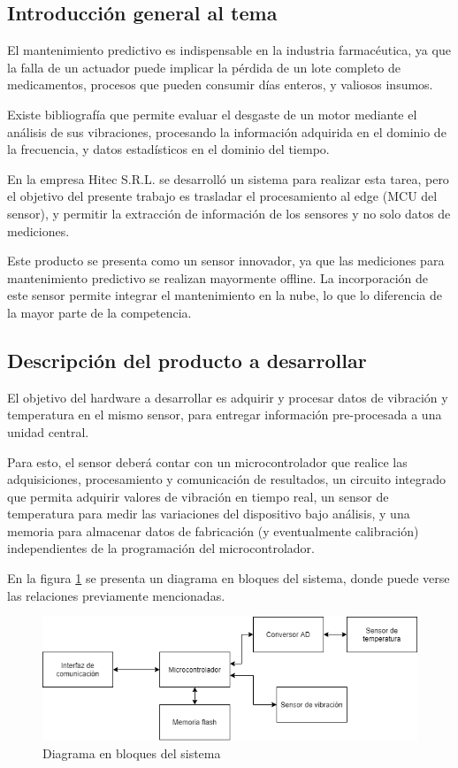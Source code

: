 \documentclass[11pt]{charter}
\begin{document}
\subsection*{Introducción general al tema}

El mantenimiento predictivo es indispensable en la industria farmacéutica, ya que la falla de un actuador puede implicar la pérdida de un lote completo de medicamentos, procesos que pueden consumir días enteros, y valiosos insumos.

Existe bibliografía que permite evaluar el desgaste de un motor mediante el análisis de sus vibraciones, procesando la información adquirida en el dominio de la frecuencia, y datos estadísticos en el dominio del tiempo.

En la empresa Hitec S.R.L. se desarrolló un sistema para realizar esta tarea, pero el objetivo del presente trabajo es trasladar el procesamiento al edge (MCU del sensor), y permitir la extracción de información de los sensores y no solo datos de mediciones.

Este producto se presenta como un sensor innovador, ya que las mediciones para mantenimiento predictivo se realizan mayormente offline. La incorporación de este sensor permite integrar el mantenimiento en la nube, lo que lo diferencia de la mayor parte de la competencia.

\subsection*{Descripción del producto a desarrollar}

El objetivo del hardware a desarrollar es adquirir y procesar datos de vibración y temperatura en el mismo sensor, para entregar información pre-procesada a una unidad central.

Para esto, el sensor deberá contar con un microcontrolador que realice las adquisiciones, procesamiento y comunicación de resultados, un circuito integrado que permita adquirir valores de vibración en tiempo real, un sensor de temperatura para medir las variaciones del dispositivo bajo análisis, y una memoria para almacenar datos de fabricación (y eventualmente calibración) independientes de la programación del microcontrolador. 

En la figura \ref{fig:diagramaBloques} se presenta un diagrama en bloques del sistema, donde puede verse las relaciones previamente mencionadas.

\begin{figure}[htpb]
\centering 
\includegraphics[width=1\textwidth]{./Figuras/diagramaBloques.png}
\caption{Diagrama en bloques del sistema}
\label{fig:diagramaBloques}
\end{figure}
\end{document}
